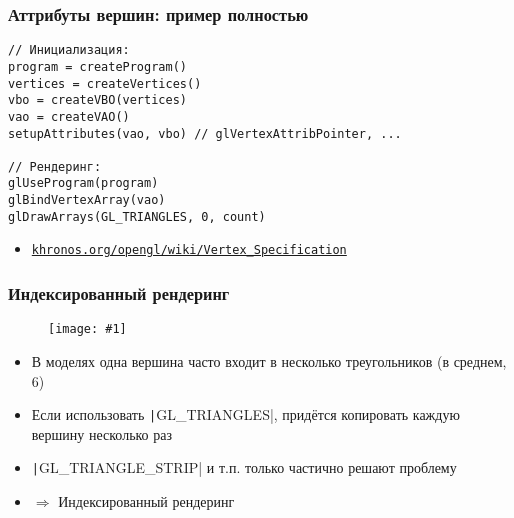 \documentclass[10pt]{beamer}
\newcommand{\slideimage}[1]{
  \begin{figure}
    \begin{adjustbox}{width=\textwidth, totalheight=\textheight-2\baselineskip-2\baselineskip,keepaspectratio}
      \texttt{[image: \#1]}
    \end{adjustbox}
  \end{figure}
}
\begin{document}
\begin{frame}[fragile]
\frametitle{Аттрибуты вершин: пример полностью}
\begin{verbatim}
// Инициализация:
program = createProgram()
vertices = createVertices()
vbo = createVBO(vertices)
vao = createVAO()
setupAttributes(vao, vbo) // glVertexAttribPointer, ...

// Рендеринг:
glUseProgram(program)
glBindVertexArray(vao)
glDrawArrays(GL_TRIANGLES, 0, count)
\end{verbatim}
\pause
\begin{itemize}
\item \href{https://www.khronos.org/opengl/wiki/Vertex_Specification}{\nolinkurl{khronos.org/opengl/wiki/Vertex\_Specification}}
\end{itemize}
\end{frame}

\begin{frame}[fragile]
\frametitle{Индексированный рендеринг}
\slideimage{spheres.png}
\begin{itemize}
\item В моделях одна вершина часто входит в несколько треугольников (в среднем, 6)
\pause
\item Если использовать \texttt|GL_TRIANGLES|, придётся копировать каждую вершину несколько раз
\pause
\item \texttt|GL_TRIANGLE_STRIP| и т.п. только частично решают проблему
\pause
\item \begin{math}\Rightarrow\end{math} Индексированный рендеринг
\end{itemize}
\end{frame}
\end{document}
